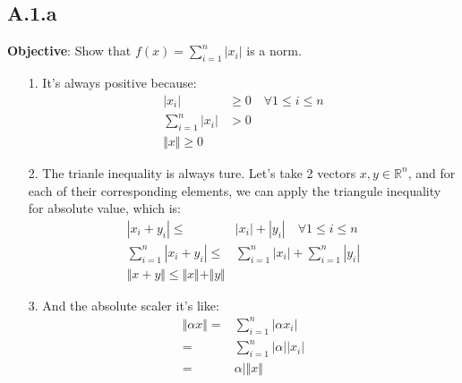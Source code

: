 \documentclass[]{article}
\begin{document}
    \subsection*{A.1.a}
        \textbf{Objective}: Show that $f(x) = \sum_{i = 1}^{n}|x_i|$ is a norm. 
        \begin{enumerate}
            \item[1.] It's always positive because: 
                \begin{align*}\tag{A.1.a.1}\label{eqn:A.1.a.1}
                    |x_i| &\ge 0 \quad \forall 1 \le i \le n
                    \\
                    \sum_{i = 1}^{n} |x_i| &> 0
                    \\
                    \Vert x\Vert \ge 0
                \end{align*}
            \item[2.] The trianle inequality is always ture. Let's take 2 vectors $x, y \in \mathbb{R}^n$, and for each of their corresponding elements, we can apply the triangule inequality for absolute value, which is: 
            \begin{align*}\tag{A.1.a.2}\label{eqn:A.1.a.2}
                |x_i + y_i| \le& |x_i| + |y_i| \quad \forall 1\le i \le n
                \\
                \sum_{i = 1}^{n}|x_i + y_i| \le&
                \sum_{i = 1}^{n} |x_i| + \sum_{i = 1}^{n} |y_i| 
                \\
                \Vert x + y\Vert\le \Vert x\Vert + \Vert y \Vert
            \end{align*} 
            \item[3.] And the absolute scaler it's like: 
            \begin{align*}\tag{A.1.a.3}\label{eqn:A.1.a.3}
                \Vert \alpha x\Vert =&  \sum_{i = 1}^{n} |\alpha x_i|
                \\
                =& \sum_{i = 1}^{n}|\alpha||x_i| 
                \\
                =& 
                \alpha|\Vert x\Vert
            \end{align*}
        \end{enumerate}
\end{document}
